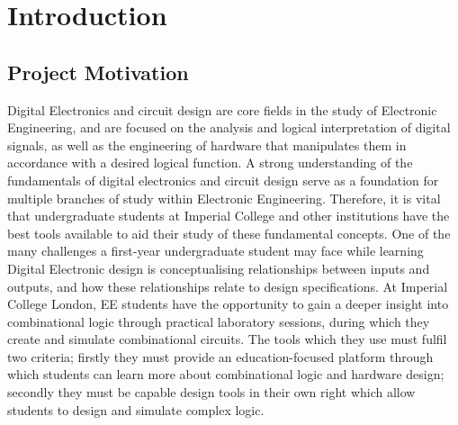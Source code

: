 \clearpage
{}

\chapter{Introduction}

\section{Project Motivation}

Digital Electronics and circuit design are core fields in the study of Electronic Engineering, and are focused on the analysis and logical interpretation of digital signals, as well as the engineering of hardware that manipulates them in accordance with a desired logical function. A strong understanding of the fundamentals of digital electronics and circuit design serve as a foundation for multiple branches of study within Electronic Engineering. Therefore, it is vital that undergraduate students at Imperial College and other institutions have the best tools available to aid their study of these fundamental concepts.
One of the many challenges a first-year undergraduate student may face while learning Digital Electronic design is conceptualising relationships between inputs and outputs, and how these relationships relate to design specifications. At Imperial College London, EE students have the opportunity to gain a deeper insight into combinational logic through practical laboratory sessions, during which they create and simulate combinational circuits. The tools which they use must fulfil two criteria; firstly they must provide an education-focused platform through which students can learn more about combinational logic and hardware design; secondly they must be capable design tools in their own right which allow students to design and simulate complex logic.

